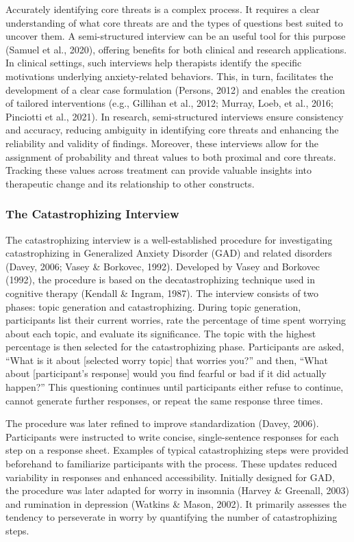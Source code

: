 \documentclass[
  man,floatsintext]{apa7}
\begin{document}
Accurately identifying core threats is a complex process.
It requires a clear understanding of what core threats are and the types of questions best suited to uncover them.
A semi-structured interview can be an useful tool for this purpose (Samuel et al., 2020), offering benefits for both clinical and research applications.
In clinical settings, such interviews help therapists identify the specific motivations underlying anxiety-related behaviors.
This, in turn, facilitates the development of a clear case formulation (Persons, 2012) and enables the creation of tailored interventions (e.g., Gillihan et al., 2012; Murray, Loeb, et al., 2016; Pinciotti et al., 2021).
In research, semi-structured interviews ensure consistency and accuracy, reducing ambiguity in identifying core threats and enhancing the reliability and validity of findings.
Moreover, these interviews allow for the assignment of probability and threat values to both proximal and core threats.
Tracking these values across treatment can provide valuable insights into therapeutic change and its relationship to other constructs.

\subsubsection{The Catastrophizing Interview}\label{the-catastrophizing-interview}

The catastrophizing interview is a well-established procedure for investigating catastrophizing in Generalized Anxiety Disorder (GAD) and related disorders (Davey, 2006; Vasey \& Borkovec, 1992).
Developed by Vasey and Borkovec (1992), the procedure is based on the decatastrophizing technique used in cognitive therapy (Kendall \& Ingram, 1987).
The interview consists of two phases: topic generation and catastrophizing.
During topic generation, participants list their current worries, rate the percentage of time spent worrying about each topic, and evaluate its significance.
The topic with the highest percentage is then selected for the catastrophizing phase.
Participants are asked, ``What is it about {[}selected worry topic{]} that worries you?'' and then, ``What about {[}participant's response{]} would you find fearful or bad if it did actually happen?'' This questioning continues until participants either refuse to continue, cannot generate further responses, or repeat the same response three times.

The procedure was later refined to improve standardization (Davey, 2006).
Participants were instructed to write concise, single-sentence responses for each step on a response sheet.
Examples of typical catastrophizing steps were provided beforehand to familiarize participants with the process.
These updates reduced variability in responses and enhanced accessibility.
Initially designed for GAD, the procedure was later adapted for worry in insomnia (Harvey \& Greenall, 2003) and rumination in depression (Watkins \& Mason, 2002).
It primarily assesses the tendency to perseverate in worry by quantifying the number of catastrophizing steps.
\end{document}
